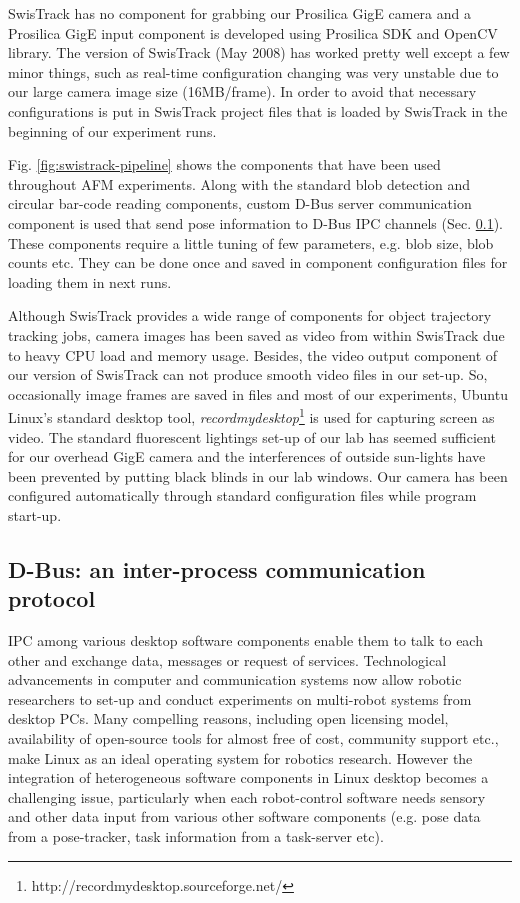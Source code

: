 SwisTrack has no component for grabbing our Prosilica GigE camera and  a Prosilica GigE input component is developed using Prosilica SDK and OpenCV library. The version of SwisTrack (May 2008) has worked pretty well except a few minor things, such as real-time configuration changing was very unstable due to our large camera image size (16MB/frame). In order to avoid that  necessary configurations is put in SwisTrack project files that is loaded by SwisTrack in the beginning of our experiment runs.

Fig. \ref{fig:swistrack-pipeline} shows the components that  have been used throughout AFM experiments. Along with the standard blob detection and circular bar-code reading components,  custom D-Bus server communication component is used that send pose information to D-Bus \acf{IPC} channels (Sec. \ref{expt-tools:dbus}). These components require a little tuning of few parameters, e.g. blob size, blob counts etc. They can be done once and saved in component configuration files for loading them in next runs. 

Although SwisTrack provides a wide range of components for object trajectory tracking jobs, camera images has been saved as video from within SwisTrack due to heavy CPU load and memory usage. Besides, the video output component of our version of SwisTrack can not produce smooth video files in our set-up. So,  occasionally  image frames are saved in files and most of our experiments, Ubuntu Linux's standard desktop  tool, {\em recordmydesktop}\footnote{http://recordmydesktop.sourceforge.net/} is used for capturing screen as video. The standard fluorescent lightings set-up of our lab has seemed sufficient for our overhead GigE camera and the interferences of outside sun-lights have been prevented by putting black blinds in our lab windows. Our camera has been configured automatically through standard configuration files while program start-up.
\subsection{D-Bus: an inter-process communication protocol}
\label{expt-tools:dbus}
IPC among various desktop software components enable them to talk to each other and exchange data, messages or request of services. Technological advancements in computer and communication systems now allow robotic researchers to set-up and conduct experiments on multi-robot systems from desktop PCs. Many compelling reasons, including open licensing model, availability of open-source tools for almost free of cost, community support etc., make Linux as an ideal operating system for robotics research. However the integration of heterogeneous software components in Linux desktop becomes a challenging issue, particularly when each robot-control software needs sensory and other data input from various other software components (e.g. pose data from a pose-tracker, task information from a task-server etc).

